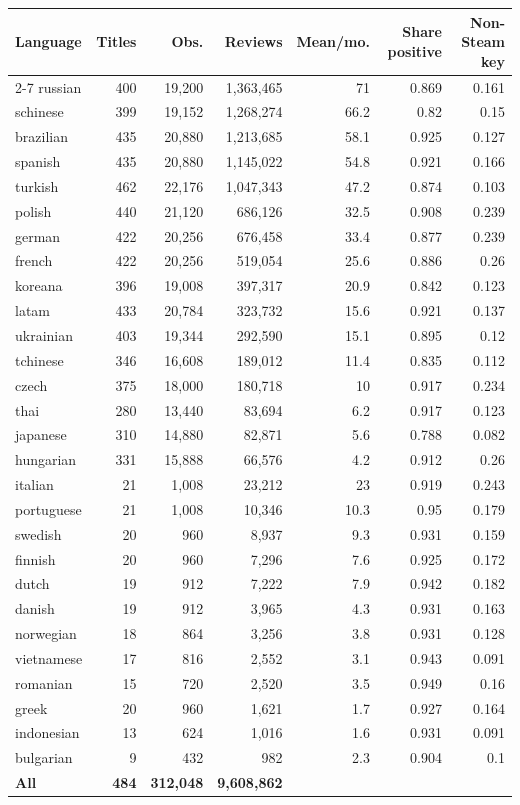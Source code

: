 \begin{tabular}{lrrrrrr}
\toprule
Language & Titles & Obs. & Reviews & Mean/mo. & Share positive & Non-Steam key \\
\cmidrule(lr){2-7}
russian & 400 & 19,200 & 1,363,465 & 71 & 0.869 & 0.161 \\
schinese & 399 & 19,152 & 1,268,274 & 66.2 & 0.82 & 0.15 \\
brazilian & 435 & 20,880 & 1,213,685 & 58.1 & 0.925 & 0.127 \\
spanish & 435 & 20,880 & 1,145,022 & 54.8 & 0.921 & 0.166 \\
turkish & 462 & 22,176 & 1,047,343 & 47.2 & 0.874 & 0.103 \\
polish & 440 & 21,120 & 686,126 & 32.5 & 0.908 & 0.239 \\
german & 422 & 20,256 & 676,458 & 33.4 & 0.877 & 0.239 \\
french & 422 & 20,256 & 519,054 & 25.6 & 0.886 & 0.26 \\
koreana & 396 & 19,008 & 397,317 & 20.9 & 0.842 & 0.123 \\
latam & 433 & 20,784 & 323,732 & 15.6 & 0.921 & 0.137 \\
ukrainian & 403 & 19,344 & 292,590 & 15.1 & 0.895 & 0.12 \\
tchinese & 346 & 16,608 & 189,012 & 11.4 & 0.835 & 0.112 \\
czech & 375 & 18,000 & 180,718 & 10 & 0.917 & 0.234 \\
thai & 280 & 13,440 & 83,694 & 6.2 & 0.917 & 0.123 \\
japanese & 310 & 14,880 & 82,871 & 5.6 & 0.788 & 0.082 \\
hungarian & 331 & 15,888 & 66,576 & 4.2 & 0.912 & 0.26 \\
italian & 21 & 1,008 & 23,212 & 23 & 0.919 & 0.243 \\
portuguese & 21 & 1,008 & 10,346 & 10.3 & 0.95 & 0.179 \\
swedish & 20 & 960 & 8,937 & 9.3 & 0.931 & 0.159 \\
finnish & 20 & 960 & 7,296 & 7.6 & 0.925 & 0.172 \\
dutch & 19 & 912 & 7,222 & 7.9 & 0.942 & 0.182 \\
danish & 19 & 912 & 3,965 & 4.3 & 0.931 & 0.163 \\
norwegian & 18 & 864 & 3,256 & 3.8 & 0.931 & 0.128 \\
vietnamese & 17 & 816 & 2,552 & 3.1 & 0.943 & 0.091 \\
romanian & 15 & 720 & 2,520 & 3.5 & 0.949 & 0.16 \\
greek & 20 & 960 & 1,621 & 1.7 & 0.927 & 0.164 \\
indonesian & 13 & 624 & 1,016 & 1.6 & 0.931 & 0.091 \\
bulgarian & 9 & 432 & 982 & 2.3 & 0.904 & 0.1 \\
\midrule
\textbf{All} & \textbf{484} & \textbf{312,048} & \textbf{9,608,862} & & & \\
\bottomrule
\end{tabular}
